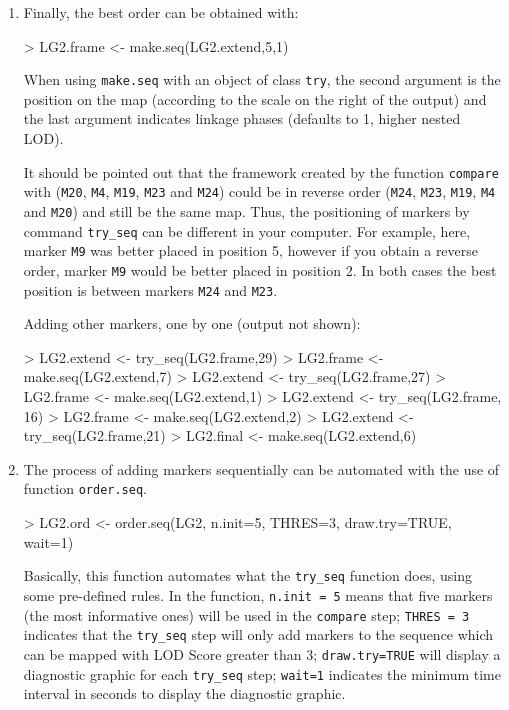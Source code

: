 \documentclass[letterpaper,12pt,oneside]{article}
\begin{document}
\begin{enumerate}
\item  Finally, the best order can be obtained with:
\begin{Schunk}
\begin{Sinput}
> LG2.frame <- make.seq(LG2.extend,5,1)
\end{Sinput}
\end{Schunk}
When using {\tt make.seq} with an object of class {\tt try}, the second argument is the position on the map (according to the scale on the right of the output) and the last argument indicates linkage phases (defaults to 1, higher nested LOD).

It should be pointed out that the framework created by the function {\tt compare} with ({\tt M20},   {\tt M4},  {\tt M19},  {\tt M23} and {\tt M24}) could be in reverse order ({\tt M24}, {\tt M23}, {\tt M19}, {\tt M4} and {\tt M20}) and still be the same map. Thus, the positioning of markers by command {\tt try_seq} can be different in your computer. For example, here, marker {\tt M9} was better placed in position 5, however if you obtain a reverse order,  marker {\tt M9} would be better placed in position 2. In both cases the best position is between markers {\tt M24} and {\tt M23}.

Adding other markers, one by one (output not shown):

\begin{Schunk}
\begin{Sinput}
> LG2.extend <- try_seq(LG2.frame,29)
> LG2.frame <- make.seq(LG2.extend,7)
> LG2.extend <- try_seq(LG2.frame,27)
> LG2.frame <- make.seq(LG2.extend,1)
> LG2.extend <- try_seq(LG2.frame, 16)
> LG2.frame <- make.seq(LG2.extend,2)
> LG2.extend <- try_seq(LG2.frame,21)
> LG2.final <- make.seq(LG2.extend,6)
\end{Sinput}
\end{Schunk}

\item The process of adding markers sequentially can be automated with the use of function {\tt order.seq}.
  
\begin{Schunk}
\begin{Sinput}
> LG2.ord <- order.seq(LG2, n.init=5, THRES=3, draw.try=TRUE, wait=1)
\end{Sinput}
\end{Schunk}

Basically, this function automates what the {\tt try_seq} function does, using some pre-defined rules. In the function, {\tt n.init = 5} means that five markers (the most informative ones) will be used in the {\tt compare} step; {\tt THRES = 3} indicates that the {\tt try_seq} step will only add markers to the sequence which can be mapped with LOD Score greater than 3; {\tt draw.try=TRUE} will display a diagnostic graphic for each {\tt try_seq} step; {\tt wait=1} indicates the minimum time interval in seconds to display the diagnostic graphic. 


\end{enumerate}
\end{document}
